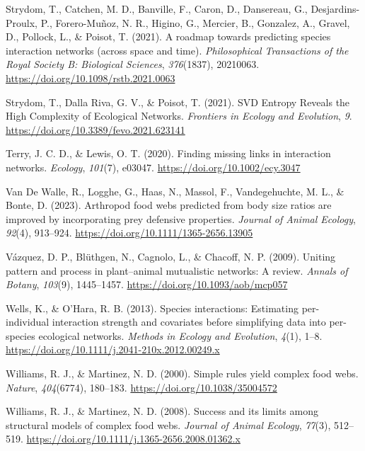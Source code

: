 \documentclass[
]{article}
\newlength{\cslhangindent}
\newenvironment{CSLReferences}[2] %
 {\begin{list}{}{%
  \setlength{\itemindent}{0pt}
  \setlength{\leftmargin}{0pt}
  \setlength{\parsep}{0pt}
  \ifodd #1
   \setlength{\leftmargin}{\cslhangindent}
   \setlength{\itemindent}{-1\cslhangindent}
  \fi
  \setlength{\itemsep}{#2\baselineskip}}}
 {\end{list}}
\begin{document}
\begin{CSLReferences}{1}{0}
Strydom, T., Catchen, M. D., Banville, F., Caron, D., Dansereau, G.,
Desjardins-Proulx, P., Forero-Muñoz, N. R., Higino, G., Mercier, B.,
Gonzalez, A., Gravel, D., Pollock, L., \& Poisot, T. (2021). A roadmap
towards predicting species interaction networks (across space and time).
\emph{Philosophical Transactions of the Royal Society B: Biological
Sciences}, \emph{376}(1837), 20210063.
\url{https://doi.org/10.1098/rstb.2021.0063}

Strydom, T., Dalla Riva, G. V., \& Poisot, T. (2021). {SVD Entropy
Reveals} the {High Complexity} of {Ecological Networks}. \emph{Frontiers
in Ecology and Evolution}, \emph{9}.
\url{https://doi.org/10.3389/fevo.2021.623141}

Terry, J. C. D., \& Lewis, O. T. (2020). Finding missing links in
interaction networks. \emph{Ecology}, \emph{101}(7), e03047.
\url{https://doi.org/10.1002/ecy.3047}

Van De Walle, R., Logghe, G., Haas, N., Massol, F., Vandegehuchte, M.
L., \& Bonte, D. (2023). Arthropod food webs predicted from body size
ratios are improved by incorporating prey defensive properties.
\emph{Journal of Animal Ecology}, \emph{92}(4), 913--924.
\url{https://doi.org/10.1111/1365-2656.13905}

Vázquez, D. P., Blüthgen, N., Cagnolo, L., \& Chacoff, N. P. (2009).
Uniting pattern and process in plant--animal mutualistic networks: A
review. \emph{Annals of Botany}, \emph{103}(9), 1445--1457.
\url{https://doi.org/10.1093/aob/mcp057}

Wells, K., \& O'Hara, R. B. (2013). Species interactions: Estimating
per-individual interaction strength and covariates before simplifying
data into per-species ecological networks. \emph{Methods in Ecology and
Evolution}, \emph{4}(1), 1--8.
\url{https://doi.org/10.1111/j.2041-210x.2012.00249.x}

Williams, R. J., \& Martinez, N. D. (2000). Simple rules yield complex
food webs. \emph{Nature}, \emph{404}(6774), 180--183.
\url{https://doi.org/10.1038/35004572}

Williams, R. J., \& Martinez, N. D. (2008). Success and its limits among
structural models of complex food webs. \emph{Journal of Animal
Ecology}, \emph{77}(3), 512--519.
\url{https://doi.org/10.1111/j.1365-2656.2008.01362.x}


\end{CSLReferences}
\end{document}
